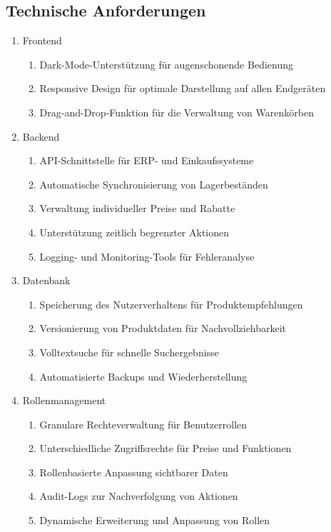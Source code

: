 \documentclass[%
	ngerman,
	12pt,
	a4paper,
	oneside
]{scrbook}
\begin{document}
	\subsection{Technische Anforderungen}
	\begin{enumerate}
		\item Frontend
		\begin{enumerate}
			\item Dark-Mode-Unterstützung für augenschonende Bedienung
			\item Responsive Design für optimale Darstellung auf allen Endgeräten
			\item Drag-and-Drop-Funktion für die Verwaltung von Warenkörben
		\end{enumerate}
		\item Backend
		\begin{enumerate}
			\item API-Schnittstelle für ERP- und Einkaufssysteme
			\item Automatische Synchronisierung von Lagerbeständen
			\item Verwaltung individueller Preise und Rabatte
			\item Unterstützung zeitlich begrenzter Aktionen
			\item Logging- und Monitoring-Tools für Fehleranalyse
		\end{enumerate}
		\item Datenbank
		\begin{enumerate}
			\item Speicherung des Nutzerverhaltens für Produktempfehlungen
			\item Versionierung von Produktdaten für Nachvollziehbarkeit
			\item Volltextsuche für schnelle Suchergebnisse
			\item Automatisierte Backups und Wiederherstellung
		\end{enumerate}
		\item Rollenmanagement
		\begin{enumerate}
			\item Granulare Rechteverwaltung für Benutzerrollen
			\item Unterschiedliche Zugriffsrechte für Preise und Funktionen
			\item Rollenbasierte Anpassung sichtbarer Daten
			\item Audit-Logs zur Nachverfolgung von Aktionen
			\item Dynamische Erweiterung und Anpassung von Rollen
		\end{enumerate}
	\end{enumerate}
\end{document}

